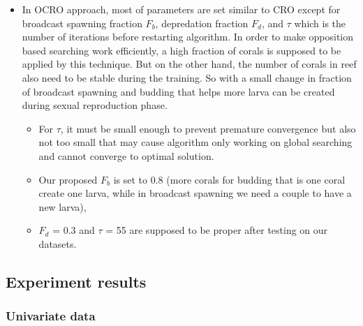 \documentclass[review,3p,authoryear]{elsarticle}
\begin{document}
\begin{itemize}
\item In OCRO approach, most of parameters are set similar to CRO except for 
	broadcast spawning fraction $F_{b}$, 
	depredation fraction $F_{d}$, and 
	$\tau$ which is the number of iterations before restarting algorithm. 
In order to make opposition based searching work efficiently, a high fraction of corals is supposed to be applied by this technique. But on the other hand, the  number of corals in reef also need to be stable during the training. So with a small change in fraction of broadcast spawning and budding that helps more larva can be created during sexual reproduction phase.
	\begin{itemize} 
		\item For $\tau$, it must be small enough to prevent premature convergence but also not too small that may cause algorithm only working on global searching and cannot converge to optimal solution. 
		\item Our proposed $F_{b}$ is set to 0.8 (more corals for budding that is one coral create one larva, while in broadcast spawning we need a couple to have a new larva), 
		\item $F_{d}$ = 0.3 and $\tau$ = 55 are supposed to be proper after testing on our datasets.
	\end{itemize}
\end{itemize}


\subsection{Experiment results}
\label{results_discussion}

\subsubsection{Univariate data}
\end{document}
